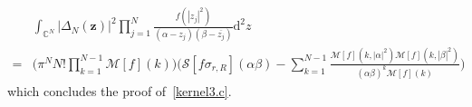 \documentclass[pdflatex,sn-mathphys-num]{sn-jnl}
\theoremstyle{thmstyleone}
\numberwithin{equation}{section}
\newcommand{\C}{\mathbb{C}}
\begin{document}
\begin{appendices}
    \begin{equation}
    \begin{split}\label{id:vandermonde3}
    &\int_{\C^{N}}^{} \left | \Delta_{N}\left ( \mathbf{z} \right ) \right |^{2}\prod\limits_{j=1}^{N}\frac{f\left ( \left | z_{j} \right |^{2} \right )}{\left ( \alpha-z_{j} \right )\left ( \beta-\overline{z_{j}} \right )}\mathrm{d}^{2}z \nonumber
    \\
    =&\Bigg(\pi^{N}N!\prod\limits_{k=1}^{N-1}\mathcal{M}\left[ f \right]\left( k \right)\Bigg)\Bigg(\mathcal{S}\left[ f\sigma_{r,R} \right]\left( \alpha\beta \right)-\sum\limits_{k=1}^{N-1}\frac{\mathcal{M}\left[ f \right]\left( k,\left| \alpha \right|^{2} \right)\mathcal{M}\left[ f \right]\left( k,\left| \beta \right|^{2} \right)}{\left( \alpha\beta \right)^{k}\mathcal{M}\left[ f \right]\left( k \right)}\Bigg)
    \end{split}
    \end{equation}
which concludes the proof of~\eqref{kernel3.c}.


\end{appendices}

\nocite{*}

\end{document}
